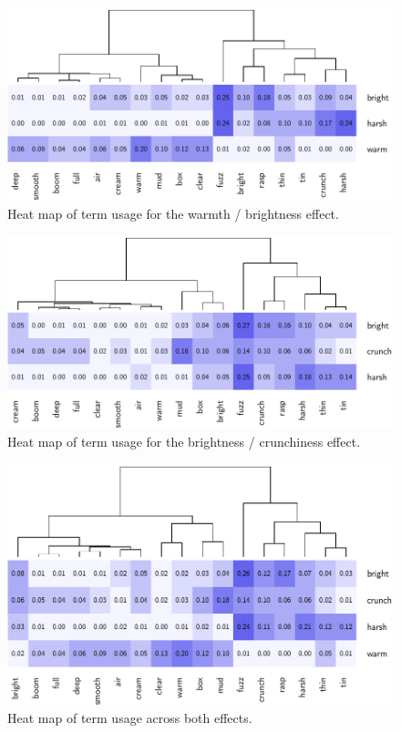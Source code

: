 			\begin{figure}[h!]
				\centering
				\includegraphics{chapter7/Images/HarshConfusion.pdf}
				\caption{Heat map of term usage for the warmth / brightness effect.}
				\label{fig:HarshConfusion}
			\end{figure}

			\begin{figure}[h!]
				\centering
				\includegraphics{chapter7/Images/CrunchConfusion.pdf}
				\caption{Heat map of term usage for the brightness / crunchiness effect.}
				\label{fig:CrunchConfusion}
			\end{figure}

			\begin{figure}[h!]
				\centering
				\includegraphics{chapter7/Images/CombinedConfusion.pdf}
				\caption{Heat map of term usage across both effects.}
				\label{fig:CombConfusion}
			\end{figure}

